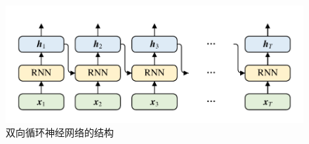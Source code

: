 \begin{figure}[htb]
	\centering
	\includegraphics[page=3, width=0.75\linewidth]{images/structure.pdf}
	\caption{双向循环神经网络的结构}
	\label{fig:Bidirectional}
\end{figure}